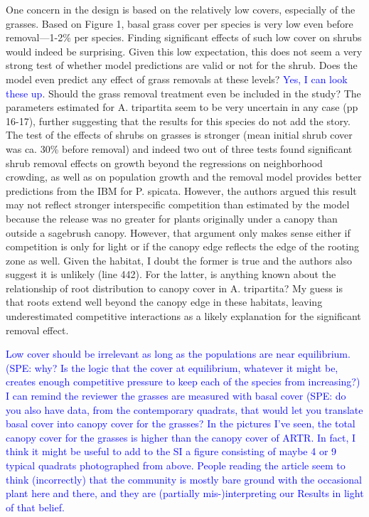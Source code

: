 \documentclass[12pt]{article}
\newcommand{\response}{\textcolor{blue}}
\begin{document}
{One concern in the design is based on the relatively low covers, especially of the grasses. Based on
Figure 1, basal grass cover per species is very low even before removal—1-2\% per species. Finding
significant effects of such low cover on shrubs would indeed be surprising. Given this low expectation,
this does not seem a very strong test of whether model predictions are valid or not for the shrub. Does
the model even predict any effect of grass removals at these levels? \response{Yes, I can look these up}. Should the grass removal
treatment even be included in the study? The parameters estimated for A. tripartita seem to be very
uncertain in any case (pp 16-17), further suggesting that the results for this species do not add the story.
The test of the effects of shrubs on grasses is stronger (mean initial shrub cover was ca. 30\% before
removal) and indeed two out of three tests found significant shrub removal effects on growth beyond
the regressions on neighborhood crowding, as well as on population growth and the removal model
provides better predictions from the IBM for P. spicata. However, the authors argued this result may
not reflect stronger interspecific competition than estimated by the model because the release was no
greater for plants originally under a canopy than outside a sagebrush canopy. However, that argument
only makes sense either if competition is only for light or if the canopy edge reflects the edge of the
rooting zone as well. Given the habitat, I doubt the former is true and the authors also suggest it is
unlikely (line 442). For the latter, is anything known about the relationship of root distribution to
canopy cover in A. tripartita? My guess is that roots extend well beyond the canopy edge in these
habitats, leaving underestimated competitive interactions as a likely explanation for the significant
removal effect.

\response{Low cover should be irrelevant as long as the populations are near equilibrium. (SPE: why? Is the logic that
the cover at equilibrium, whatever it might be, creates enough competitive pressure to keep each of the species
from increasing?) I can remind the reviewer the grasses are measured with basal cover (SPE: do you also have data, from the
contemporary quadrats, that would let you translate basal cover into canopy cover for the grasses? In the pictures I've seen,
the total canopy cover for the grasses is higher than the canopy cover of ARTR. In fact, I think it might be useful to add to the
SI a figure consisting of maybe 4 or 9 typical quadrats photographed from above. People reading the article seem to think (incorrectly) 
that the community is mostly bare ground with the occasional plant here and there, and they are (partially mis-)interpreting our Results in light
of that belief.}

}
\end{document}

